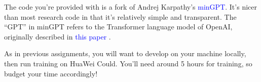 \documentclass[letterpaper,12pt]{article}
\begin{document}
	\noindent The code you’re provided with is a fork of Andrej Karpathy’s \textcolor{blue}{minGPT}. It’s nicer than most research code in that it’s relatively simple and transparent. The “GPT” in minGPT refers to the Transformer language model of OpenAI, originally described in \textcolor{blue}{this paper} \cite{b1}.
	
	\noindent As in previous assignments, you will want to develop on your machine locally, then run training on HuaWei Could. You’ll need around 5 hours for training, so budget your time accordingly!

	
	
	
\end{document}
